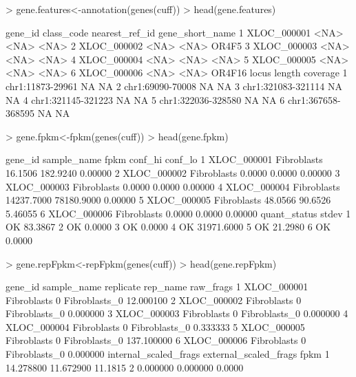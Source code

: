 \documentclass[10pt]{article}
\begin{document}
\begin{Schunk}
\begin{Sinput}
> gene.features<-annotation(genes(cuff))
> head(gene.features)
\end{Sinput}
\begin{Soutput}
      gene_id class_code nearest_ref_id gene_short_name
1 XLOC_000001       <NA>           <NA>            <NA>
2 XLOC_000002       <NA>           <NA>           OR4F5
3 XLOC_000003       <NA>           <NA>            <NA>
4 XLOC_000004       <NA>           <NA>            <NA>
5 XLOC_000005       <NA>           <NA>            <NA>
6 XLOC_000006       <NA>           <NA>          OR4F16
               locus length coverage
1   chr1:11873-29961     NA       NA
2   chr1:69090-70008     NA       NA
3 chr1:321083-321114     NA       NA
4 chr1:321145-321223     NA       NA
5 chr1:322036-328580     NA       NA
6 chr1:367658-368595     NA       NA
\end{Soutput}
\begin{Sinput}
> gene.fpkm<-fpkm(genes(cuff))
> head(gene.fpkm)
\end{Sinput}
\begin{Soutput}
      gene_id sample_name       fpkm    conf_hi conf_lo
1 XLOC_000001 Fibroblasts    16.1506   182.9240 0.00000
2 XLOC_000002 Fibroblasts     0.0000     0.0000 0.00000
3 XLOC_000003 Fibroblasts     0.0000     0.0000 0.00000
4 XLOC_000004 Fibroblasts 14237.7000 78180.9000 0.00000
5 XLOC_000005 Fibroblasts    48.0566    90.6526 5.46055
6 XLOC_000006 Fibroblasts     0.0000     0.0000 0.00000
  quant_status      stdev
1           OK    83.3867
2           OK     0.0000
3           OK     0.0000
4           OK 31971.6000
5           OK    21.2980
6           OK     0.0000
\end{Soutput}
\begin{Sinput}
> gene.repFpkm<-repFpkm(genes(cuff))
> head(gene.repFpkm)
\end{Sinput}
\begin{Soutput}
      gene_id sample_name replicate      rep_name  raw_frags
1 XLOC_000001 Fibroblasts         0 Fibroblasts_0  12.000100
2 XLOC_000002 Fibroblasts         0 Fibroblasts_0   0.000000
3 XLOC_000003 Fibroblasts         0 Fibroblasts_0   0.000000
4 XLOC_000004 Fibroblasts         0 Fibroblasts_0   0.333333
5 XLOC_000005 Fibroblasts         0 Fibroblasts_0 137.100000
6 XLOC_000006 Fibroblasts         0 Fibroblasts_0   0.000000
  internal_scaled_frags external_scaled_frags       fpkm
1             14.278800             11.672900    11.1815
2              0.000000              0.000000     0.0000

\end{Soutput}
\end{Schunk}
\end{document}
